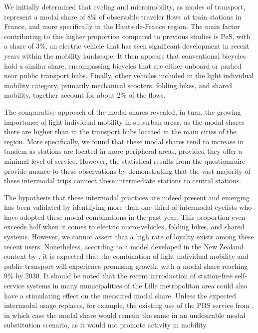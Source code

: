 \begin{refsegment}
We initially determined that cycling and micromobility, as modes of transport, represent a modal share of 8\% of observable traveler flows at train stations in France, and more specifically in the Hauts-de-France region. The main factor contributing to this higher proportion compared to previous studies is \acrshort{PeS}, with a share of 3\%, an electric vehicle that has seen significant development in recent years within the mobility landscape. It then appears that conventional bicycles hold a similar share, encompassing bicycles that are either onboard or parked near public transport hubs. Finally, other vehicles included in the light individual mobility category, primarily mechanical scooters, folding bikes, and shared mobility, together account for about 2\% of the flows.%

The comparative approach of the modal shares revealed, in turn, the growing importance of light individual mobility in suburban areas, as the modal shares there are higher than in the transport hubs located in the main cities of the region. More specifically, we found that these modal shares tend to increase in tandem as stations are located in more peripheral areas, provided they offer a minimal level of service. However, the statistical results from the questionnaire provide nuance to these observations by demonstrating that the vast majority of these intermodal trips connect these intermediate stations to central stations.%

The hypothesis that these intermodal practices are indeed present and emerging has been validated by identifying more than one-third of intermodal cyclists who have adopted these modal combinations in the past year. This proportion even exceeds half when it comes to electric micro-vehicles, folding bikes, and shared systems. However, we cannot assert that a high rate of loyalty exists among these recent users. Nonetheless, according to a model developed in the New Zealand context by \textcolor{blue}{\textcite[]{ensor_mode_2021}}, it is expected that the combination of light individual mobility and public transport will experience promising growth, with a modal share reaching 9\% by 2030. It should be noted that the recent introduction of station-free self-service systems in many municipalities of the Lille metropolitan area could also have a stimulating effect on the measured modal share. Unless the expected intermodal usage replaces, for example, the existing use of the \acrshort{PBS} service from , in which case the modal share would remain the same in an undesirable modal substitution scenario, as it would not promote activity in mobility.%


\end{refsegment}
